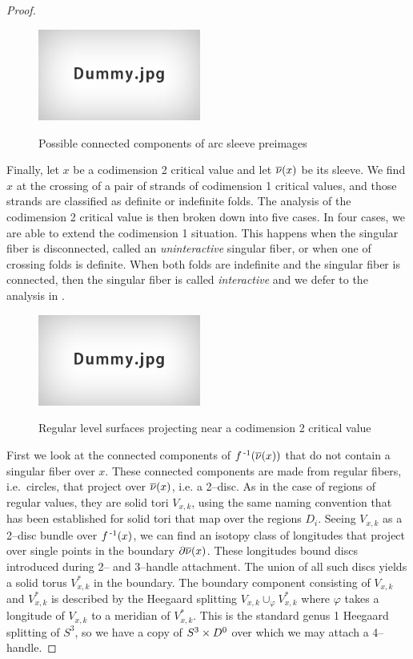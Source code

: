 \begin{proof}
	\begin{figure}
		\centering
		\captionsetup{justification=centering}
		\caption{Possible connected components of arc sleeve preimages}
		\includegraphics[height=3cm]{figures/dummy.jpg}
		\label{fig:arcsleevepre}
	\end{figure}
	
	Finally, let $x$ be a codimension 2 critical value and let $\overline{\nu}(x)$ be its sleeve.
	We find $x$ at the crossing of a pair of strands of codimension 1 critical values, and those strands are classified as definite or indefinite folds.
	The analysis of the codimension 2 critical value is then broken down into five cases.
	In four cases, we are able to extend the codimension 1 situation.
	This happens when the singular fiber is disconnected, called an \emph{uninteractive} singular fiber, or when one of crossing folds is definite.
	When both folds are indefinite and the singular fiber is connected, then the singular fiber is called \emph{interactive} and we defer to the analysis in \cite{CostThur08}.
	
	\begin{figure}
		\centering
		\captionsetup{justification=centering}
		\caption{Regular level surfaces projecting near a codimension 2 critical value}
		\includegraphics[height=3cm]{figures/dummy.jpg}
		\label{fig:regprojcodim2}
	\end{figure}
	
	First we look at the connected components of $f^{\,\text{-}1}(\overline{\nu}(x))$ that do not contain a singular fiber over $x$.
	These connected components are made from regular fibers, i.e.\ circles, that project over $\overline{\nu}(x)$, i.e. a 2--disc.
	As in the case of regions of regular values, they are solid tori $V_{x,k}$, using the same naming convention that has been established for solid tori that map over the regions $D_i$.
	Seeing $V_{x,k}$ as a 2--disc bundle over $f^{\,\text{-}1}(x)$, we can find an isotopy class of longitudes that project over single points in the boundary $\partial\overline{\nu}(x)$.
	These longitudes bound discs introduced during 2-- and 3--handle attachment.
	The union of all such discs yields a solid torus $V_{x,k}^*$ in the boundary.
	The boundary component consisting of $V_{x,k}$ and $V_{x,k}^*$ is described by the Heegaard splitting $V_{x,k}\cup_\varphi V_{x,k}^*$ where $\varphi$ takes a longitude of $V_{x,k}$ to a meridian of $V_{x,k}^*$.
	This is the standard genus 1 Heegaard splitting of $S^3$, so we have a copy of $S^3\times D^0$ over which we may attach a 4--handle.


\end{proof}
